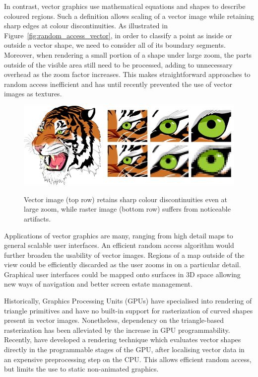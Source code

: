 \documentclass[11pt,a4paper,twoside]{article}
\begin{document}
In contrast, vector graphics use mathematical equations and shapes to describe coloured regions. Such a definition allows scaling of a vector image while retaining sharp edges at colour discontinuities. As illustrated in Figure~\ref{fig:random_access_vector}, in order to classify a point as inside or outside a vector shape, we need to consider all of its boundary segments. Moreover, when rendering a small portion of a shape under large zoom, the parts outside of the visible area still need to be processed, adding to unnecessary overhead as the zoom factor increases. This makes straightforward approaches to random access inefficient and has until recently prevented the use of vector images as textures.


\begin {figure}
	\centering
	\includegraphics[width=1.0\columnwidth] {figures/tiger_zoom} \label{fig:tiger_zoom}
	\caption {Vector image (top row) retains sharp colour discontinuities even at large zoom, while raster image (bottom row) suffers from noticeable artifacts.}
	\label {fig:zoom}
\end {figure}

Applications of vector graphics are many, ranging from high detail maps to general scalable user interfaces.  An efficient random access algorithm would further broaden the usability of vector images. Regions of a map outside of the view could be efficiently discarded as the user zooms in on a particular detail. Graphical user interfaces could be mapped onto surfaces in 3D space allowing new ways of navigation and better screen estate management.

Historically, Graphics Processing Units (GPUs) have specialised into rendering of triangle primitives and have no built-in support for rasterization of curved shapes present in vector images. Nonetheless, dependency on the triangle-based rasterization has been alleviated by the increase in GPU programmability. Recently, \cite{NehabHoppe08} have developed a rendering technique which evaluates vector shapes directly in the programmable stages of the GPU, after localising vector data in an expensive preprocessing step on the CPU. This allows efficient random access, but limits the use to static non-animated graphics.
\end{document}
